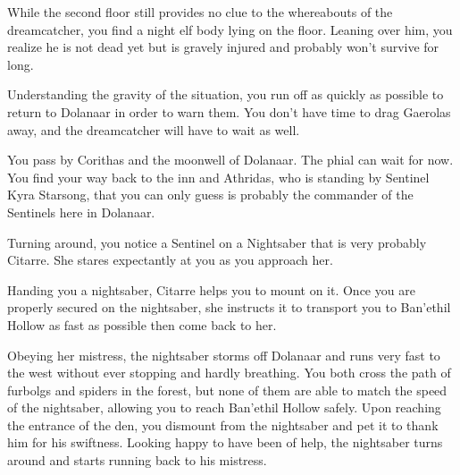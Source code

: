 While the second floor still provides no clue to the whereabouts of the dreamcatcher, you find a night elf body lying on the floor. Leaning over him, you realize he is not dead yet but is gravely injured and probably won't survive for long.



Understanding the gravity of the situation, you run off as quickly as possible to return to Dolanaar in order to warn them. You don't have time to drag Gaerolas away, and the dreamcatcher will have to wait as well. %

You pass by Corithas and the moonwell of Dolanaar. The phial can wait for now. You find your way back to the inn and Athridas, who is standing by Sentinel Kyra Starsong, that you can only guess is probably the commander of the Sentinels here in Dolanaar.





Turning around, you notice a Sentinel on a Nightsaber that is very probably Citarre. She stares expectantly at you as you approach her.


Handing you a nightsaber, Citarre helps you to mount on it. Once you are properly secured on the nightsaber, she instructs it to transport you to Ban'ethil Hollow as fast as possible then come back to her.

Obeying her mistress, the nightsaber storms off Dolanaar and runs very fast to the west without ever stopping and hardly breathing. You both cross the path of furbolgs and spiders in the forest, but none of them are able to match the speed of the nightsaber, allowing you to reach Ban'ethil Hollow safely. Upon reaching the entrance of the den, you dismount from the nightsaber and pet it to thank him for his swiftness. Looking happy to have been of help, the nightsaber turns around and starts running back to his mistress.
